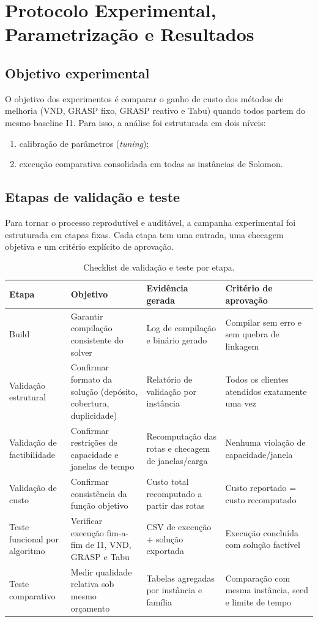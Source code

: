 \section{Protocolo Experimental, Parametrização e Resultados}
\label{sec:protocolo}

\subsection{Objetivo experimental}

O objetivo dos experimentos é comparar o ganho de custo dos métodos de melhoria (VND, GRASP fixo, GRASP reativo e Tabu) quando todos partem do mesmo baseline I1.
Para isso, a análise foi estruturada em dois níveis:
\begin{enumerate}
  \item calibração de parâmetros (\emph{tuning});
  \item execução comparativa consolidada em todas as instâncias de Solomon.
\end{enumerate}

\subsection{Etapas de validação e teste}
\label{subsec:etapas_validacao_teste}

Para tornar o processo reprodutível e auditável, a campanha experimental foi estruturada em etapas fixas.
Cada etapa tem uma entrada, uma checagem objetiva e um critério explícito de aprovação.

\begin{table}[htbp]
\centering
\caption{Checklist de validação e teste por etapa.}
\label{tab:validation_checklist}
\begin{tabular}{p{2.8cm}p{4.1cm}p{4.0cm}p{4.0cm}}
\hline
Etapa & Objetivo & Evidência gerada & Critério de aprovação \\
\hline
Build & Garantir compilação consistente do solver & Log de compilação e binário gerado & Compilar sem erro e sem quebra de linkagem \\
Validação estrutural & Confirmar formato da solução (depósito, cobertura, duplicidade) & Relatório de validação por instância & Todos os clientes atendidos exatamente uma vez \\
Validação de factibilidade & Confirmar restrições de capacidade e janelas de tempo & Recomputação das rotas e checagem de janelas/carga & Nenhuma violação de capacidade/janela \\
Validação de custo & Confirmar consistência da função objetivo & Custo total recomputado a partir das rotas & Custo reportado = custo recomputado \\
Teste funcional por algoritmo & Verificar execução fim-a-fim de I1, VND, GRASP e Tabu & CSV de execução + solução exportada & Execução concluída com solução factível \\
Teste comparativo & Medir qualidade relativa sob mesmo orçamento & Tabelas agregadas por instância e família & Comparação com mesma instância, seed e limite de tempo \\
\hline
\end{tabular}
\end{table}

